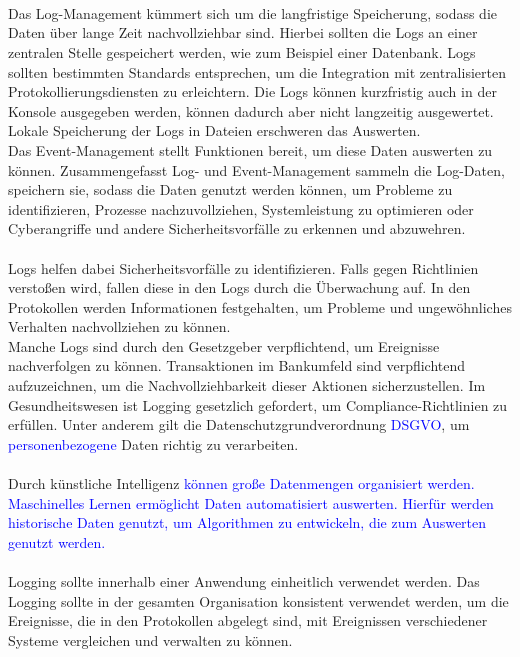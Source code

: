 \\
\\
\\
Das Log-Management kümmert sich um die langfristige Speicherung, sodass die Daten über lange Zeit nachvollziehbar sind.
Hierbei sollten die Logs an einer zentralen Stelle gespeichert werden, wie zum Beispiel einer Datenbank.
Logs sollten bestimmten Standards entsprechen, um die Integration mit zentralisierten Protokollierungsdiensten zu erleichtern.
Die Logs können kurzfristig auch in der Konsole ausgegeben werden, können dadurch aber nicht langzeitig ausgewertet.
Lokale Speicherung der Logs in Dateien erschweren das Auswerten.\autocite{ip-insider, ait}
\\
Das Event-Management stellt Funktionen bereit, um diese Daten auswerten zu können.
Zusammengefasst Log- und Event-Management sammeln die Log-Daten, speichern sie, sodass die Daten genutzt werden können, um Probleme zu identifizieren, Prozesse nachzuvollziehen, Systemleistung zu optimieren oder Cyberangriffe und andere Sicherheitsvorfälle zu erkennen und abzuwehren.\autocite{ip-insider}
\\
\\
Logs helfen dabei Sicherheitsvorfälle zu identifizieren.
Falls gegen Richtlinien verstoßen wird, fallen diese in den Logs durch die Überwachung auf.
In den Protokollen werden Informationen festgehalten, um Probleme und ungewöhnliches Verhalten nachvollziehen zu können.
\\
Manche Logs sind durch den Gesetzgeber verpflichtend, um Ereignisse nachverfolgen zu können.
Transaktionen im Bankumfeld sind verpflichtend aufzuzeichnen, um die Nachvollziehbarkeit dieser Aktionen sicherzustellen.
Im Gesundheitswesen ist Logging gesetzlich gefordert, um Compliance-Richtlinien zu erfüllen.
Unter anderem gilt die Datenschutzgrundverordnung \textcolor{blue}{DSGVO}, um \textcolor{blue}{personenbezogene} Daten richtig zu verarbeiten.\autocite{ip-insider, owasp}
\\
\\
Durch künstliche Intelligenz
\textcolor{blue}{
    können große Datenmengen organisiert werden.
    Maschinelles Lernen ermöglicht Daten automatisiert auswerten.
    Hierfür werden historische Daten genutzt, um Algorithmen zu entwickeln, die zum Auswerten genutzt werden.
}\autocite{ip-insider}
\\
\\
Logging sollte innerhalb einer Anwendung einheitlich verwendet werden.
Das Logging sollte in der gesamten Organisation konsistent verwendet werden, um die Ereignisse, die in den Protokollen abgelegt sind, mit Ereignissen verschiedener Systeme vergleichen und verwalten zu können.
